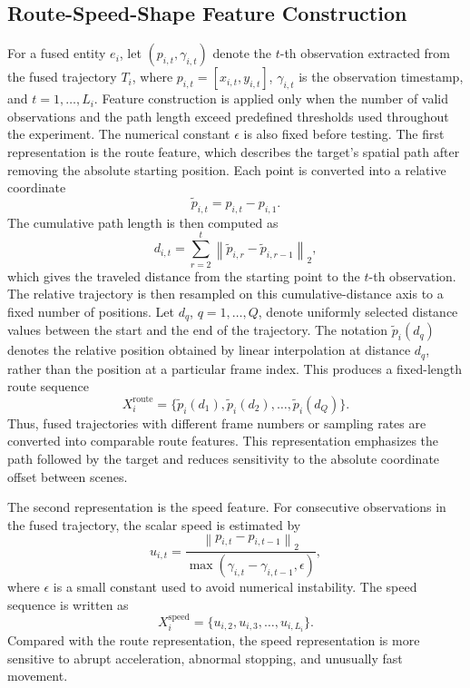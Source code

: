 \subsection{Route-Speed-Shape Feature Construction}
For a fused entity \(e_i\), let \((p_{i,t},\gamma_{i,t})\) denote the \(t\)-th observation extracted from the fused trajectory \(T_i\), where \(p_{i,t}=[x_{i,t},y_{i,t}]\), \(\gamma_{i,t}\) is the observation timestamp, and \(t=1,\ldots,L_i\). Feature construction is applied only when the number of valid observations and the path length exceed predefined thresholds used throughout the experiment. The numerical constant \(\epsilon\) is also fixed before testing. The first representation is the route feature, which describes the target's spatial path after removing the absolute starting position. Each point is converted into a relative coordinate
\begin{equation}
  \tilde{p}_{i,t} = p_{i,t} - p_{i,1}.
\end{equation}
The cumulative path length is then computed as
\begin{equation}
  d_{i,t}=\sum_{r=2}^{t}\left\|\tilde{p}_{i,r}-\tilde{p}_{i,r-1}\right\|_2,
\end{equation}
which gives the traveled distance from the starting point to the \(t\)-th observation. The relative trajectory is then resampled on this cumulative-distance axis to a fixed number of positions. Let \(d_q\), \(q=1,\ldots,Q\), denote uniformly selected distance values between the start and the end of the trajectory. The notation \(\tilde{p}_{i}(d_q)\) denotes the relative position obtained by linear interpolation at distance \(d_q\), rather than the position at a particular frame index. This produces a fixed-length route sequence
\begin{equation}
  X_{i}^{\mathrm{route}}=\{\tilde{p}_{i}(d_1),\tilde{p}_{i}(d_2),\ldots,\tilde{p}_{i}(d_Q)\}.
\end{equation}
Thus, fused trajectories with different frame numbers or sampling rates are converted into comparable route features. This representation emphasizes the path followed by the target and reduces sensitivity to the absolute coordinate offset between scenes.

The second representation is the speed feature. For consecutive observations in the fused trajectory, the scalar speed is estimated by
\begin{equation}
  u_{i,t}=
  \frac{\left\|p_{i,t}-p_{i,t-1}\right\|_2}
  {\max(\gamma_{i,t}-\gamma_{i,t-1},\epsilon)},
\end{equation}
where \(\epsilon\) is a small constant used to avoid numerical instability. The speed sequence is written as
\begin{equation}
  X_{i}^{\mathrm{speed}}=\{u_{i,2},u_{i,3},\ldots,u_{i,L_i}\}.
\end{equation}
Compared with the route representation, the speed representation is more sensitive to abrupt acceleration, abnormal stopping, and unusually fast movement.


